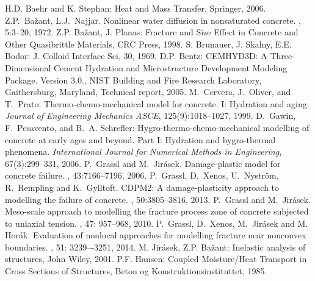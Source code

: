 \documentclass[a4paper]{article}
\begin{document}
\begin{thebibliography}{99}
 H.D. Baehr and K. Stephan: Heat and Mass Transfer, Springer, 2006.
 Z.P.~Ba\v{z}ant, L.J.~Najjar.
\newblock  Nonlinear water diffusion in nonsaturated concrete.
, 5:3--20, 1972.
 Z.P. Ba\v{z}ant, J. Planas: Fracture and Size
  Effect in Concrete and Other Quasibrittle  Materials, CRC Press,
  1998.
 S. Brunauer, J. Skalny, E.E. Bodor: J. Colloid Interface
  Sci, 30, 1969.
 D.P. Bentz: CEMHYD3D: A Three-Dimensional Cement Hydration and Microstructure Development Modeling Package. Version 3.0., NIST Building and Fire Research Laboratory, Gaithersburg, Maryland, Technical report, 2005.
 M.~Cervera, J.~Oliver, and T.~Prato: Thermo-chemo-mechanical model for concrete. I: Hydration and aging. {\em Journal of Engineering Mechanics ASCE}, 125(9):1018--1027, 1999.
 D.~Gawin, F.~Pesavento, and B.~A. Schrefler: Hygro-thermo-chemo-mechanical modelling of concrete at early ages and beyond. Part I: Hydration and hygro-thermal phenomena. {\em International Journal for Numerical Methods in Engineering}, 67(3):299--331, 2006.
 P.~Grassl and M.~Jir\'{a}sek.
\newblock Damage-plastic model for concrete failure.
, 43:7166--7196, 2006.
 P.~Grassl, D.~Xenos, U.~Nystr\"{o}m, R.~Rempling and K.~Gylltoft.
\newblock CDPM2: A damage-plasticity approach to modelling the failure of concrete.
, 50:3805--3816, 2013.
 P.~Grassl and M.~Jir\'{a}sek.
\newblock Meso-scale approach to modelling the fracture process zone of concrete subjected to uniaxial tension.
, 47: 957--968, 2010.
 P.~Grassl, D.~Xenos, M.~Jir\'{a}sek and M.~ Hor\'{a}k.
\newblock  Evaluation of nonlocal approaches for modelling fracture near nonconvex boundaries.
, 51: 3239–-3251, 2014.
 M. Jir\'asek, Z.P. Ba\v zant: Inelastic analysis of
  structures, John Wiley, 2001.
 P.F. Hansen: Coupled Moisture/Heat Transport in
  Cross Sections of Structures, Beton og Konstruktionsinstituttet, 1985.

\end{thebibliography}
\end{document}
